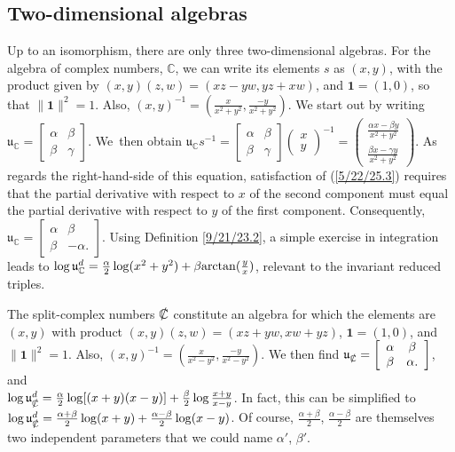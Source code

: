 \documentclass{amsart}
\theoremstyle{definition}
\numberwithin{theorem}{section}
\numberwithin{equation}{section}
\begin{document}
\subsection{Two-dimensional algebras}
Up to an isomorphism, there are only three two-dimensional algebras.
For the algebra of complex numbers, $\mathbb{C}$, we can write its elements $s$ as $(x,y)$, with the product given by $(x,y)(z,w) = (xz-yw, yz+xw)$, and $\mathbf{1}=(1,0)$, so that $\|\mathbf{1}\|^2=1$.  Also, $(x,y)^{-1} = (\frac{x}{x^2+y^2},\frac{-y}{x^2+y^2})$.  We start out by writing  $\mathfrak{u}_\mathbb{C} = \left[\begin{array}{ccc}
 \alpha & \beta   \\ 
 \beta & \gamma    
\end{array}\right]$.  \mbox{We then} obtain  $\mathfrak{u}_\mathbb{C}s^{-1} = \left[\begin{array}{ccc}
 \alpha & \beta   \\ 
 \beta & \gamma    
\end{array}\right]\left(\begin{array}{ccc}
x   \\ 
y   
\end{array}\right)^{-1} = \left(\begin{array}{ccc}
\frac{\alpha x - \beta y}{x^2+y^2}  \\ 
\frac{\beta x - \gamma y}{x^2+y^2} 
\end{array}\right)$.  As regards the right-hand-side of this equation, satisfaction of (\ref{5/22/25.3}) requires that the partial derivative with respect to $x$ of the second component must equal the partial derivative with respect to $y$ of the first component.  Consequently, $\mathfrak{u}_{\mathbb{C}} = \left[\begin{array}{ccc}
 \alpha & \beta   \\ 
 \beta & -\alpha.   
\end{array}\right]$.  Using Definition \ref{9/21/23.2}, a simple exercise in integration leads to $\log  \mathfrak{u}^d_{\mathbb{C}} = \frac{\alpha}{2}\log(x^2+y^2) + \beta{\rm arctan}(\frac{y}{x})$, relevant to the invariant reduced triples.

The split-complex numbers $\slashed{\mathbb{C}}$ constitute an algebra for which the elements are  $(x,y)$ with product $(x,y)(z,w) = (xz+yw,xw+yz)$, $ \mathbf{1} = (1,0)$, and $\|\mathbf{1}\|^2 = 1$.  Also, $(x,y)^{-1} = (\frac{x}{x^2-y^2},\frac{-y}{x^2-y^2})$. \hspace{1cm}  We then find $\mathfrak{u}_{\slashed{\mathbb{C}}} = \left[\begin{array}{ccc}
 \alpha & \beta   \\ 
 \beta & \alpha.    
\end{array}\right]$, \hspace{.5cm} and \hfill \\ $\log  \mathfrak{u}^d_{\slashed{\mathbb{C}}} = \frac{\alpha}{2}\log[(x+
y)(x-y)] +  \frac{\beta}{2}\log \frac{x+y}{x-y}$.  In fact, this can be simplified to $\log  \mathfrak{u}^d_{\slashed{\mathbb{C}}} = \frac{\alpha+\beta}{2}\log(x+y) + \frac{\alpha-\beta}{2}\log(x-y)$.  Of course, $\frac{\alpha+\beta}{2}$, $\frac{\alpha-\beta}{2}$ are themselves two independent parameters that we could name $\alpha'$, $\beta'$.
\end{document}
